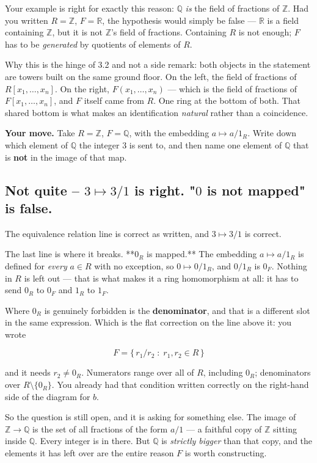 \documentclass[11pt]{article}
\begin{document}
Your example is right for exactly this reason: $\mathbb{Q}$ \emph{is} the field of fractions of $\mathbb{Z}$. Had you written $R = \mathbb{Z}$, $F = \mathbb{R}$, the hypothesis would simply be false --- $\mathbb{R}$ is a field containing $\mathbb{Z}$, but it is not $\mathbb{Z}$'s field of fractions. Containing $R$ is not enough; $F$ has to be \emph{generated} by quotients of elements of $R$.

Why this is the hinge of 3.2 and not a side remark: both objects in the statement are towers built on the same ground floor. On the left, the field of fractions of $R[x_1,\ldots,x_n]$. On the right, $F(x_1,\ldots,x_n)$ --- which is the field of fractions of $F[x_1,\ldots,x_n]$, and $F$ itself came from $R$. One ring at the bottom of both. That shared bottom is what makes an identification \emph{natural} rather than a coincidence.

\textbf{Your move.} Take $R = \mathbb{Z}$, $F = \mathbb{Q}$, with the embedding $a \mapsto a/1_R$. Write down which element of $\mathbb{Q}$ the integer $3$ is sent to, and then name one element of $\mathbb{Q}$ that is \textbf{not} in the image of that map.


\subsection*{Not quite -- $3 \mapsto 3/1$ is right. "$0$ is not mapped" is false.}
The equivalence relation line is correct as written, and $3 \mapsto 3/1$ is correct.

The last line is where it breaks. **$0_R$ is mapped.** The embedding $a \mapsto a/1_R$ is defined for \emph{every} $a \in R$ with no exception, so $0 \mapsto 0/1_R$, and $0/1_R$ is $0_F$. Nothing in $R$ is left out --- that is what makes it a ring homomorphism at all: it has to send $0_R$ to $0_F$ and $1_R$ to $1_F$.

Where $0_R$ is genuinely forbidden is the \textbf{denominator}, and that is a different slot in the same expression. Which is the flat correction on the line above it: you wrote

$$F = \{\, r_1/r_2 \;:\; r_1, r_2 \in R \,\}$$

and it needs $r_2 \neq 0_R$. Numerators range over all of $R$, including $0_R$; denominators over $R \setminus \{0_R\}$. You already had that condition written correctly on the right-hand side of the diagram for $b$.

So the question is still open, and it is asking for something else. The image of $\mathbb{Z} \to \mathbb{Q}$ is the set of all fractions of the form $a/1$ --- a faithful copy of $\mathbb{Z}$ sitting inside $\mathbb{Q}$. Every integer is in there. But $\mathbb{Q}$ is \emph{strictly bigger} than that copy, and the elements it has left over are the entire reason $F$ is worth constructing.
\end{document}
